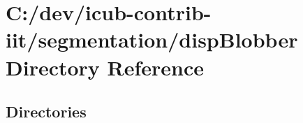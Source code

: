 \section{C\+:/dev/icub-\/contrib-\/iit/segmentation/disp\+Blobber Directory Reference}
\label{dir_96e90d3c60caf37d69cf1869ea4a9de8}
\subsection*{Directories}
\begin{DoxyCompactItemize}
\end{DoxyCompactItemize}

